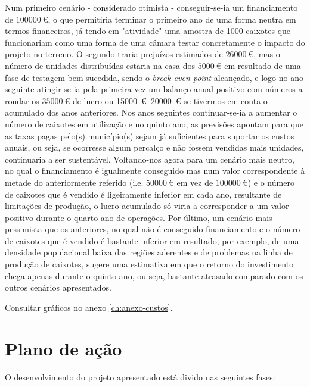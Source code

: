 \documentclass[11pt, a4paper, oneside]{book}
\begin{document}
Num primeiro cenário - considerado otimista - conseguir-se-ia um financiamento de $\SI{100 000}{\euro}$, o que permitiria terminar o primeiro ano de uma forma neutra em termos financeiros, já tendo em "atividade" uma amostra de 1000 caixotes que funcionariam como uma forma de uma câmara testar concretamente o impacto do projeto no terreno. O segundo traria prejuízos estimados de $\SI{26000}{\euro}$, mas o número de unidades distribuídas estaria na casa dos $\SI{5000}{\euro}$ em resultado de uma fase de testagem bem sucedida, sendo o \textit{break even point} alcançado, e logo no ano seguinte atingir-se-ia pela primeira vez um balanço anual positivo com números a rondar os $\SI{35000}{\euro}$ de lucro ou \SIrange{15000}{20000}{\euro} se tivermos em conta o acumulado dos anos anteriores. Nos anos seguintes continuar-se-ia a aumentar o número de caixotes em utilização e no quinto ano, as previsões apontam para que as taxas pagas pelo(s) município(s) sejam já suficientes para suportar os custos anuais, ou seja, se ocorresse algum percalço e não fossem vendidas mais unidades, continuaria a ser sustentável.
Voltando-nos agora para um cenário mais neutro, no qual o financiamento é igualmente conseguido mas num valor correspondente à metade do anteriormente referido (i.e. $\SI{50000}{\euro}$ em vez de $\SI{100000}{\euro}$) e o número de caixotes que é vendido é ligeiramente inferior em cada ano, resultante de limitações de produção, o lucro acumulado só viria a corresponder a um valor positivo durante o quarto ano de operações.
Por último, um cenário mais pessimista que os anteriores, no qual não é conseguido financiamento e o número de caixotes que é vendido é bastante inferior em resultado, por exemplo, de uma densidade populacional baixa das regiões aderentes e de problemas na linha de produção de caixotes, sugere uma estimativa em que o retorno do investimento chega apenas durante o quinto ano, ou seja, bastante atrasado comparado com os outros cenários apresentados.

Consultar gráficos no anexo \ref{ch:anexo-custos}.

\chapter{Plano de ação}

O desenvolvimento do projeto apresentado está divido nas seguintes fases:
\end{document}
